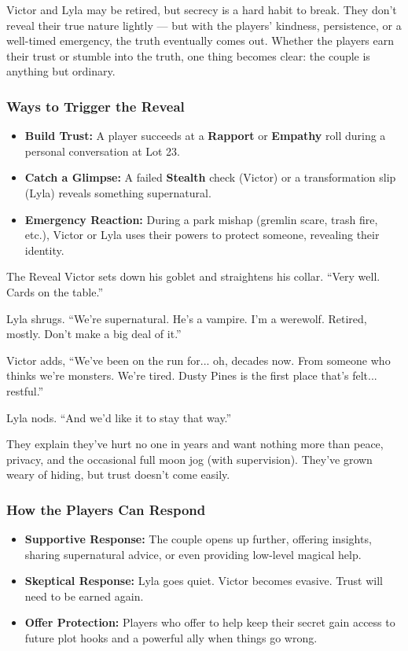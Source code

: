 Victor and Lyla may be retired, but secrecy is a hard habit to break. They don’t reveal their true nature lightly — but with the players’ kindness, persistence, or a well-timed emergency, the truth eventually comes out. Whether the players earn their trust or stumble into the truth, one thing becomes clear: the couple is anything but ordinary.

\subsubsection*{Ways to Trigger the Reveal}
\begin{itemize}
    \item \textbf{Build Trust:} A player succeeds at a \textbf{Rapport} or \textbf{Empathy} roll  during a personal conversation at Lot 23.
    \item \textbf{Catch a Glimpse:} A failed \textbf{Stealth} check (Victor) or a transformation slip (Lyla) reveals something supernatural.
    \item \textbf{Emergency Reaction:} During a park mishap (gremlin scare, trash fire, etc.), Victor or Lyla uses their powers to protect someone, revealing their identity.
\end{itemize}

\begin{Example}{The Reveal}
    Victor sets down his goblet and straightens his collar. “Very well. Cards on the table.”

    Lyla shrugs. “We’re supernatural. He’s a vampire. I’m a werewolf. Retired, mostly. Don’t make a big deal of it.”

    Victor adds, “We’ve been on the run for... oh, decades now. From someone who thinks we’re monsters. We’re tired. Dusty Pines is the first place that’s felt... restful.”

    Lyla nods. “And we’d like it to stay that way.”
\end{Example}

They explain they’ve hurt no one in years and want nothing more than peace, privacy, and the occasional full moon jog (with supervision). They’ve grown weary of hiding, but trust doesn’t come easily.

\subsubsection*{How the Players Can Respond}
\begin{itemize}
    \item \textbf{Supportive Response:} The couple opens up further, offering insights, sharing supernatural advice, or even providing low-level magical help.
    \item \textbf{Skeptical Response:} Lyla goes quiet. Victor becomes evasive. Trust will need to be earned again.
    \item \textbf{Offer Protection:} Players who offer to help keep their secret gain access to future plot hooks and a powerful ally when things go wrong.
\end{itemize}

